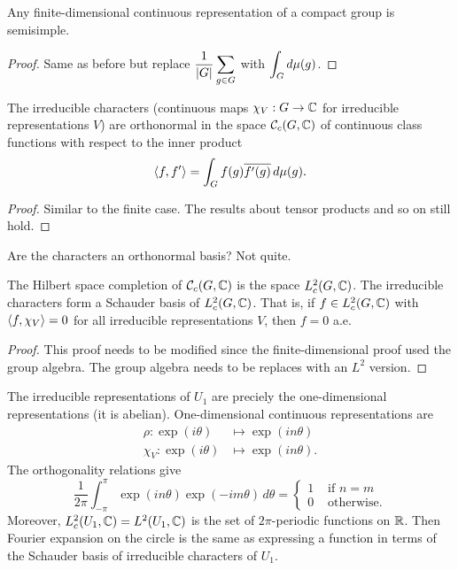 \begin{thm}
  Any finite-dimensional continuous representation of a compact group is semisimple.
\end{thm}

\begin{proof}
  Same as before but replace $\displaystyle \frac{1}{\left\lvert G \right\rvert} \sum_{g \in G}$ with $\displaystyle \int_G d\mu(g)$.
\end{proof}

\begin{thm}
  The irreducible characters (continuous maps $\chi_V: G \to \mathbb{C}$ for irreducible representations $V$) are orthonormal in the space $\mathcal{C}_c(G,\mathbb{C})$ of continuous class functions with respect to the inner product
  \[ {\left\langle f,f' \right\rangle} = \int_G f(g) \overline{f'(g)} \, d\mu(g).\]
\end{thm}

\begin{proof}
  Similar to the finite case.
  The results about tensor products and so on still hold.
\end{proof}

Are the characters an orthonormal basis? Not quite.

\begin{thm}
  The Hilbert space completion of $\mathcal{C}_c(G,\mathbb{C})$ is the space $L_c^2(G,\mathbb{C})$.
  The irreducible characters form a Schauder basis of $L^2_c(G,\mathbb{C})$.
  That is, if $f \in L^2_c(G,\mathbb{C})$ with ${\left\langle f,\chi_V \right\rangle}=0$ for all irreducible representations $V$, then $f=0$ a.e.
\end{thm}

\begin{proof}
  This proof needs to be modified since the finite-dimensional proof used the group algebra.
  The group algebra needs to be replaces with an $L^2$ version.
\end{proof}

\begin{exam}
  The irreducible representations of $U_1$ are preciely the one-dimensional representations (it is abelian).
  One-dimensional continuous representations are
  \begin{align*}
    \rho: \exp(i\theta) &\mapsto \exp(in\theta) \\
    \chi_V: \exp(i\theta) &\mapsto \exp(in\theta).
  \end{align*}
  The orthogonality relations give
  \[ \frac{1}{2\pi} \int_{-\pi}^\pi \exp(in\theta) \exp(-im\theta) \, d\theta =
    \begin{cases}
      1 & \text{ if } n=m \\
      0 & \text{ otherwise}.
    \end{cases}
  \]
  Moreover, $L^2_c(U_1,\mathbb{C})=L^2(U_1,\mathbb{C})$ is the set of $2\pi$-periodic functions on $\mathbb{R}$.
  Then Fourier expansion on the circle is the same as expressing a function in terms of the Schauder basis of irreducible characters of $U_1$.
\end{exam}

